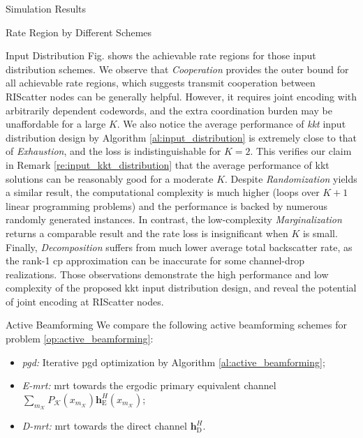 \documentclass[journal]{IEEEtran}
\begin{document}
\begin{section}{Simulation Results}
\begin{subsection}{Rate Region by Different Schemes}
\begin{subsubsection}{Input Distribution}
			Fig.  shows the achievable rate regions for those input distribution schemes.
			We observe that \emph{Cooperation} provides the outer bound for all achievable rate regions, which suggests transmit cooperation between RIScatter nodes can be generally helpful.
			However, it requires joint encoding with arbitrarily dependent codewords, and the extra coordination burden may be unaffordable for a large $K$.
			We also notice the average performance of \emph{\gls{kkt}} input distribution design by Algorithm \ref{al:input_distribution} is extremely close to that of \emph{Exhaustion}, and the loss is indistinguishable for $K=2$.
			This verifies our claim in Remark \ref{re:input_kkt_distribution} that the average performance of \gls{kkt} solutions can be reasonably good for a moderate $K$.
			Despite \emph{Randomization} yields a similar result, the computational complexity is much higher (loops over $K+1$ linear programming problems) and the performance is backed by numerous randomly generated instances.
			In contrast, the low-complexity \emph{Marginalization} returns a comparable result and the rate loss is insignificant when $K$ is small.
			Finally, \emph{Decomposition} suffers from much lower average total backscatter rate, as the rank-\num{1} \gls{cp} approximation can be inaccurate for some channel-drop realizations.
			Those observations demonstrate the high performance and low complexity of the proposed \gls{kkt} input distribution design, and reveal the potential of joint encoding at RIScatter nodes.
		\end{subsubsection}


		\begin{subsubsection}{Active Beamforming}
			We compare the following active beamforming schemes for problem \eqref{op:active_beamforming}:
			\begin{itemize}
				\item \emph{\gls{pgd}:} Iterative \gls{pgd} optimization by Algorithm \ref{al:active_beamforming};
				\item \emph{E-\gls{mrt}:} \gls{mrt} towards the ergodic primary equivalent channel $\sum_{m_{\mathcal{K}}} P_{\mathcal{K}}(x_{m_{\mathcal{K}}}) \boldsymbol{h}_{\mathrm{E}}^H(x_{m_{\mathcal{K}}})$;
				\item \emph{D-\gls{mrt}:} \gls{mrt} towards the direct channel $\boldsymbol{h}_{\mathrm{D}}^H$.
			\end{itemize}


\end{subsubsection}
\end{subsection}
\end{section}
\end{document}
